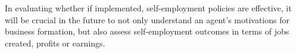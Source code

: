 In evaluating whether if implemented, self-employment policies are effective, it will be crucial in the future to not only understand an agent's motivations for business formation, but also assess self-employment outcomes in terms of jobs created, profits or earnings. 














